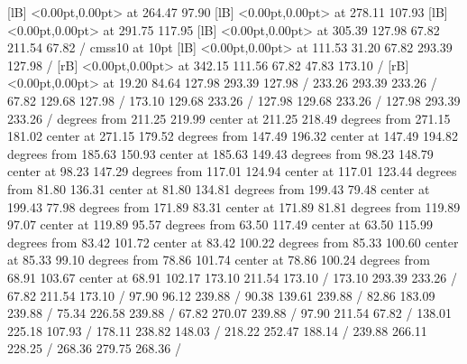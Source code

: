 {  [lB] <0.00pt,0.00pt> at 264.47 97.90
  [lB] <0.00pt,0.00pt> at 278.11 107.93
  [lB] <0.00pt,0.00pt> at 291.75 117.95
  [lB] <0.00pt,0.00pt> at 305.39 127.98
\setsolid
{} 67.82 211.54 67.82 /
\font\picfont cmss10 at 10pt\picfont
{}  [lB] <0.00pt,0.00pt> at 111.53 31.20
\setsolid
{} 67.82 293.39 127.98 /
 [rB] <0.00pt,0.00pt> at 342.15 111.56
\setsolid
{} 67.82 47.83 173.10 /
 [rB] <0.00pt,0.00pt> at 19.20 84.64
\setsolid
{} 127.98 293.39 127.98 /
\setsolid
{} 233.26 293.39 233.26 /
\setsolid
{} 67.82 129.68 127.98 /
\setsolid
{} 173.10 129.68 233.26 /
\setsolid
{} 127.98 129.68 233.26 /
\setsolid
{} 127.98 293.39 233.26 /
 degrees from 211.25 219.99 center at 211.25 218.49
 degrees from 271.15 181.02 center at 271.15 179.52
 degrees from 147.49 196.32 center at 147.49 194.82
 degrees from 185.63 150.93 center at 185.63 149.43
 degrees from 98.23 148.79 center at 98.23 147.29
 degrees from 117.01 124.94 center at 117.01 123.44
 degrees from 81.80 136.31 center at 81.80 134.81
 degrees from 199.43 79.48 center at 199.43 77.98
 degrees from 171.89 83.31 center at 171.89 81.81
 degrees from 119.89 97.07 center at 119.89 95.57
 degrees from 63.50 117.49 center at 63.50 115.99
 degrees from 83.42 101.72 center at 83.42 100.22
 degrees from 85.33 100.60 center at 85.33 99.10
 degrees from 78.86 101.74 center at 78.86 100.24
 degrees from 68.91 103.67 center at 68.91 102.17
\setsolid
{} 173.10 211.54 173.10 /
\setsolid
{} 173.10 293.39 233.26 /
\setsolid
{} 67.82 211.54 173.10 /
\setdashpattern <4pt, 4pt>
 97.90 96.12 239.88 /
\setdashpattern <4pt, 4pt>
 90.38 139.61 239.88 /
\setdashpattern <4pt, 4pt>
 82.86 183.09 239.88 /
\setdashpattern <4pt, 4pt>
 75.34 226.58 239.88 /
\setdashpattern <4pt, 4pt>
 67.82 270.07 239.88 /
\setdashpattern <4pt, 4pt>
 97.90 211.54 67.82 /
\setdashpattern <4pt, 4pt>
 138.01 225.18 107.93 /
\setdashpattern <4pt, 4pt>
 178.11 238.82 148.03 /
\setdashpattern <4pt, 4pt>
 218.22 252.47 188.14 /
\setdashpattern <4pt, 4pt>
 239.88 266.11 228.25 /
\setdashpattern <4pt, 4pt>
 268.36 279.75 268.36 /
\endpicture
}
